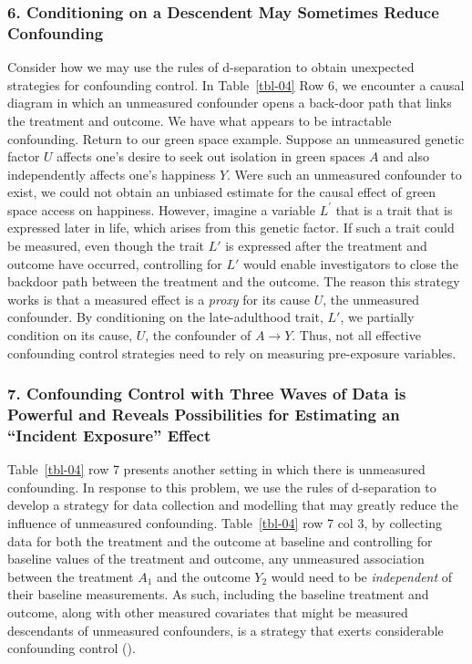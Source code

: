 \documentclass[
  singlecolumn]{article}
\begin{document}
\subsubsection{6. Conditioning on a Descendent May Sometimes Reduce
Confounding}\label{conditioning-on-a-descendent-may-sometimes-reduce-confounding}

Consider how we may use the rules of d-separation to obtain unexpected
strategies for confounding control. In Table~\ref{tbl-04} Row 6, we
encounter a causal diagram in which an unmeasured confounder opens a
back-door path that links the treatment and outcome. We have what
appears to be intractable confounding. Return to our green space
example. Suppose an unmeasured genetic factor \(U\) affects one's desire
to seek out isolation in green spaces \(A\) and also independently
affects one's happiness \(Y\). Were such an unmeasured confounder to
exist, we could not obtain an unbiased estimate for the causal effect of
green space access on happiness. However, imagine a variable
\(L^\prime\) that is a trait that is expressed later in life, which
arises from this genetic factor. If such a trait could be measured, even
though the trait \(L'\) is expressed after the treatment and outcome
have occurred, controlling for \(L'\) would enable investigators to
close the backdoor path between the treatment and the outcome. The
reason this strategy works is that a measured effect is a \emph{proxy}
for its cause \(U\), the unmeasured confounder. By conditioning on the
late-adulthood trait, \(L'\), we partially condition on its cause,
\(U\), the confounder of \(A \to Y\). Thus, not all effective
confounding control strategies need to rely on measuring pre-exposure
variables.

\subsubsection{7. Confounding Control with Three Waves of Data is
Powerful and Reveals Possibilities for Estimating an ``Incident
Exposure''
Effect}\label{confounding-control-with-three-waves-of-data-is-powerful-and-reveals-possibilities-for-estimating-an-incident-exposure-effect}

Table~\ref{tbl-04} row 7 presents another setting in which there is
unmeasured confounding. In response to this problem, we use the rules of
d-separation to develop a strategy for data collection and modelling
that may greatly reduce the influence of unmeasured confounding.
Table~\ref{tbl-04} row 7 col 3, by collecting data for both the
treatment and the outcome at baseline and controlling for baseline
values of the treatment and outcome, any unmeasured association between
the treatment \(A_1\) and the outcome \(Y_2\) would need to be
\emph{independent} of their baseline measurements. As such, including
the baseline treatment and outcome, along with other measured covariates
that might be measured descendants of unmeasured confounders, is a
strategy that exerts considerable confounding control
().
\end{document}
